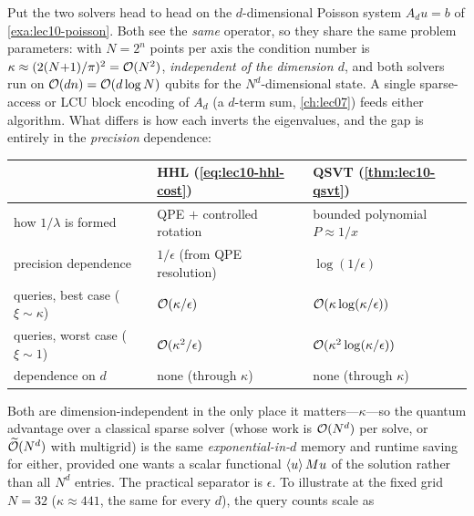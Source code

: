 \begin{example}
\label{exa:lec10-hhlvsqsvt}
Put the two solvers head to head on the $d$-dimensional Poisson system $A_d u=b$ of
\cref{exa:lec10-poisson}. Both see the \emph{same} operator, so they share the same
problem parameters: with $N=2^n$ points per axis the condition number is
$\kappa\approx(2(N{+}1)/\pi)^2=\mathcal{O}(N^2)$, \emph{independent of the dimension $d$}, and
both solvers run on $\mathcal{O}(dn)=\mathcal{O}(d\log N)$ qubits for the $N^d$-dimensional state. A
single sparse-access or LCU block encoding of $A_d$ (a $d$-term sum, \cref{ch:lec07})
feeds either algorithm. What differs is how each inverts the eigenvalues, and the gap is
entirely in the \emph{precision} dependence:
\begin{center}
\begin{tabular}{l l l}
\toprule
 & HHL (\eqref{eq:lec10-hhl-cost}) & QSVT (\cref{thm:lec10-qsvt})\\
\midrule
how $1/\lambda$ is formed & QPE $+$ controlled rotation & bounded polynomial $P\approx1/x$\\
precision dependence      & $1/\epsilon$ (from QPE resolution) & $\log(1/\epsilon)$\\
queries, best case ($\xi\sim\kappa$) & $\mathcal{O}(\kappa/\epsilon)$ & $\mathcal{O}(\kappa\log(\kappa/\epsilon))$\\
queries, worst case ($\xi\sim1$)     & $\mathcal{O}(\kappa^2/\epsilon)$\footnotemark & $\mathcal{O}(\kappa^2\log(\kappa/\epsilon))$\\
dependence on $d$ & none (through $\kappa$) & none (through $\kappa$)\\
\bottomrule
\end{tabular}
\end{center}
Both are dimension-independent in the only place it matters---$\kappa$---so the quantum
advantage over a classical sparse solver (whose work is $\mathcal{O}(N^d)$ per solve, or
$\widetilde{\mathcal{O}}(N^d)$ with multigrid) is the same \emph{exponential-in-$d$} memory and
runtime saving for either, provided one wants a scalar functional $\braket{u}{M u}$ of
the solution rather than all $N^d$ entries. The practical separator is $\epsilon$. To
illustrate at the fixed grid $N=32$ ($\kappa\approx441$, the same for every $d$), the
query counts scale as
\begin{center}
\begin{tabular}{r l l l}

\end{tabular}
\end{center}
\end{example}
